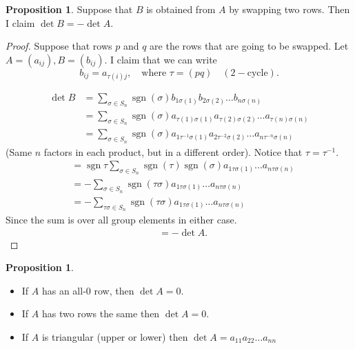 \documentclass{article}
\theoremstyle{definition}
\newtheorem{proposition}[theorem]{Proposition}
\DeclareMathOperator{\sgn}{sgn}
\begin{document}
\begin{proposition}
  \label{prp:swaprows}
  Suppose that $B$ is obtained from $A$ by swapping two rows. Then I claim $\det B = -\det A$.
\end{proposition}

  \begin{proof}
    Suppose that rows $p$ and $q$ are the rows that are going to be swapped. Let $A=(a_{ij}),B=(b_{ij})$. I claim that we can write 
    \[
    b_{ij} = a_{\tau (i) j}, \quad\text{where }\tau = (pq) \quad (2-\text{cycle}).\]

      \begin{align*}
        \det B &= \sum_{\sigma \in S_n} \sgn(\sigma) b_{1\sigma(1)}b_{2\sigma (2)}\dots b_{n \sigma (n)}\\
        &= \sum_{\sigma \in S_n} \sgn(\sigma) a_{\tau(1)\sigma(1)}a_{\tau(2)\sigma (2)}\dots a_{\tau(n) \sigma (n)}\\
        &= \sum_{\sigma \in S_n} \sgn(\sigma) a_{1\tau^{-1}\sigma(1)}a_{2\tau^{-2}\sigma (2)}\dots a_{n\tau^{-n} \sigma (n)}
      \end{align*} (Same $n$ factors in each product, but in a different order). Notice that $\tau = \tau^{-1}$.
      \begin{align*}
        &= \sgn{\tau} \sum_{\sigma \in S_n}\sgn(\tau)\sgn(\sigma)a_{1\tau\sigma(1)}\dots a_{n \tau\sigma(n)} \\
        &= - \sum_{\sigma \in S_n}\sgn(\tau\sigma)a_{1\tau\sigma(1)}\dots a_{n \tau\sigma(n)} \\
        &= - \sum_{\tau\sigma \in S_n}\sgn(\tau\sigma)a_{1\tau\sigma(1)}\dots a_{n \tau\sigma(n)} 
      \end{align*} Since the sum is over all group elements in either case.
      \begin{align*}
        &= -\det A.
      \end{align*}
  \end{proof}

  \begin{proposition}\hfill
    \label{prp:rowssame}
    \begin{itemize}
      \item 
    If $A$ has an all-0 row, then $\det A=0$.
  \item
    If $A$ has two rows the same then $\det A=0$.
  \item
    If $A$ is triangular (upper or lower) then $\det A=a_{11}a_{22}\dots a_{nn}$
    \end{itemize}


  \end{proposition}
\end{document}
